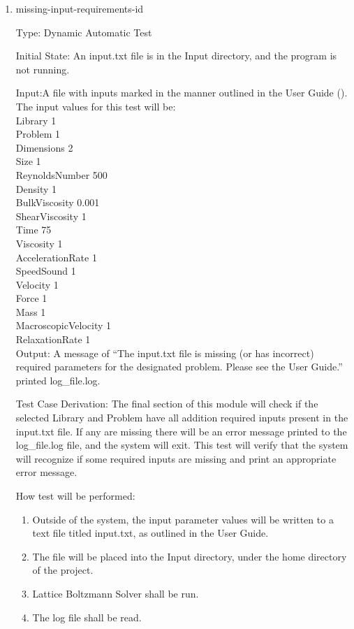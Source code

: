 \documentclass[12pt, titlepage]{article}
\newcommand{\myprogname}{Lattice Boltzmann Solver}
\newcounter{uvtestcounter} %
\begin{document}
\begin{enumerate}
	\item{missing-input-requirements-id\theuvtestcounter\\}
	
Type: Dynamic Automatic Test

Initial State: An input.txt file is in the Input directory, and the program is not running.

Input:A file with inputs marked in the manner outlined in the
User Guide (\citet{LBM_UserGuide_PM}).\\The input values for this test will
be:\\

Library 1\\
Problem 1\\
Dimensions 2\\
Size 1\\
ReynoldsNumber 500\\
Density 1\\
BulkViscosity 0.001\\
ShearViscosity 1\\
Time 75\\
Viscosity 1\\
AccelerationRate 1\\
SpeedSound 1\\
Velocity 1\\
Force 1\\
Mass 1\\
MacroscopicVelocity 1\\
RelaxationRate 1\\

Output: A message of ``The input.txt file is missing (or has incorrect) required parameters for the designated problem. Please see the User Guide.'' printed log\_file.log.

Test Case Derivation: The final section of this module will check if the selected Library and Problem have all addition required inputs present in the input.txt file. If any are missing there will be an error message printed to the log\_file.log file, and the system will exit. This test will verify that the system will recognize if some required inputs are missing and print an appropriate error message.

How test will be performed: 
\begin{enumerate}
	\item Outside of the system, the input parameter values will be written to a text file titled input.txt, as outlined in the User Guide.
	\item The file will be placed into the Input directory, under the home directory of the project.
	\item {\myprogname} shall be run. 
	\item The log file shall be read.
\end{enumerate}



\end{enumerate}
\end{document}
